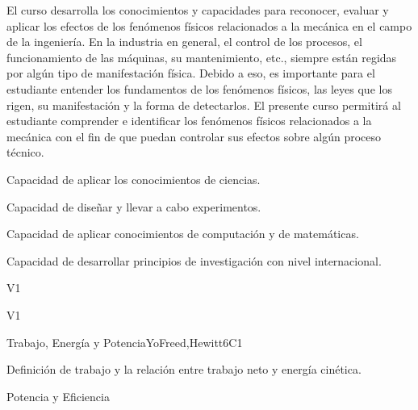 \begin{syllabus}


\begin{justification}
   El curso desarrolla los conocimientos y capacidades para reconocer, evaluar y aplicar los efectos de los fenómenos físicos relacionados a la mecánica en el campo de la ingeniería. En la industria en general, el control de los procesos, el funcionamiento de las máquinas, su mantenimiento, etc., siempre están regidas por algún tipo de manifestación física. Debido a eso, es importante para el estudiante entender los fundamentos de los fenómenos físicos, las leyes que los rigen, su manifestación y la forma de detectarlos. El presente curso permitirá al estudiante comprender e identificar los fenómenos físicos relacionados a la mecánica con el fin de que puedan controlar sus efectos sobre algún proceso técnico. 
\end{justification}

\begin{goals}
\item Capacidad de aplicar los conocimientos de ciencias.
\item Capacidad de diseñar y llevar a cabo experimentos.
\item Capacidad de aplicar conocimientos de computación y de matemáticas.
\item Capacidad de desarrollar principios de investigación con nivel internacional.
\end{goals}

\begin{outcomes}{V1}
  \item {}
  \item {}
  \item {}
\end{outcomes}

\begin{competences}{V1}
  \item {} 
  \item {}
  \item {}
\end{competences}

\begin{unit}{Trabajo, Energía y Potencia}{}{YoFreed,Hewitt}{6}{C1}
\begin{topics}
      \item Definición de trabajo y la relación entre trabajo neto y energía cinética.
      \item Potencia y Eficiencia
   \end{topics}


\end{unit}
\end{syllabus}
